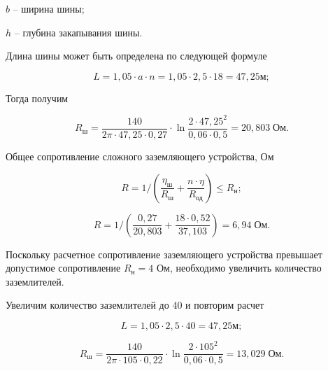         $b$ -- ширина шины;

        $h$ -- глубина закапывания шины.

        Длина шины может быть определена по следующей формуле

        \begin{equation*}
                L = 1,05 \cdot a \cdot n = 1,05 \cdot 2,5 \cdot 18
                    = 47,25 \text{м};
        \end{equation*}

        Тогда получим
        
        \begin{equation*}
                R_\text{ш} = \frac{140}{2\pi \cdot 47,25 \cdot 0,27} \cdot
                    \ln \frac{2 \cdot 47,25^2}{0,06 \cdot 0,5}
                        = 20,803 \; \text{Ом}.
        \end{equation*}
        
        Общее сопротивление сложного заземляющего устройства, Ом

        \begin{equation*}
                R = 1 / \left( \frac{\eta_\text{ш}}{R_\text{ш}} +
                    \frac{n \cdot \eta}{R_\text{од}} \right)
                        \leq R_\text{н};
        \end{equation*}

        \begin{equation*}
                R = 1 / \left( \frac{0,27}{20,803} +
                    \frac{18 \cdot 0,52}{37,103} \right)
                        = 6,94 \; \text{Ом}.
        \end{equation*}

        Поскольку расчетное сопротивление заземляющего устройства превышает
        допустимое сопротивление $R_\text{н} = 4$ %
        Ом, необходимо
        увеличить количество заземлителей.

        Увеличим количество заземлителей до 40 и повторим расчет

        \begin{equation*}
                L = 1,05 \cdot 2,5 \cdot 40
                    = 47,25 \text{м};
        \end{equation*}

        \begin{equation*}
                R_\text{ш} = \frac{140}{2\pi \cdot 105 \cdot 0,22} \cdot
                    \ln \frac{2 \cdot 105^2}{0,06 \cdot 0,5}
                        = 13,029 \; \text{Ом}.
        \end{equation*}

